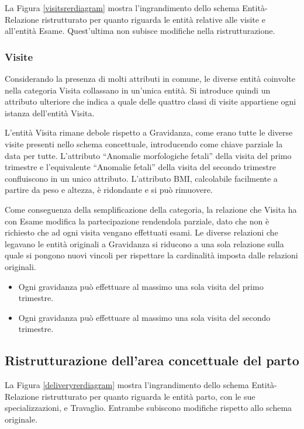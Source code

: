 La Figura \ref{visitsrerdiagram} mostra l'ingrandimento dello schema Entità-Relazione ristrutturato per quanto riguarda le entità relative alle visite e all'entità Esame.
Quest'ultima non subisce modifiche nella ristrutturazione.

\subsubsection{Visite}

Considerando la presenza di molti attributi in comune, le diverse entità coinvolte nella categoria Visita collassano in un'unica entità.
Si introduce quindi un attributo ulteriore che indica a quale delle quattro classi di visite appartiene ogni istanza dell'entità Visita.

L'entità Visita rimane debole rispetto a Gravidanza, come erano tutte le diverse visite presenti nello schema concettuale, introducendo come chiave parziale la data per tutte.
L'attributo \enquote{Anomalie morfologiche fetali} della visita del primo trimestre e l'equivalente \enquote{Anomalie fetali} della visita del secondo trimestre confluiscono in un unico attributo.
L'attributo BMI, calcolabile facilmente a partire da peso e altezza, è ridondante e si può rimuovere.

Come conseguenza della semplificazione della categoria, la relazione che Visita ha con Esame modifica la partecipazione rendendola parziale, dato che non è richiesto che ad ogni visita vengano effettuati esami.
Le diverse relazioni che legavano le entità originali a Gravidanza si riducono a una sola relazione sulla quale si pongono nuovi vincoli per rispettare la cardinalità imposta dalle relazioni originali.
\begin{itemize}
\item[\Con{}] Ogni gravidanza può effettuare al massimo una sola visita del primo trimestre.
\item[\Con{}] Ogni gravidanza può effettuare al massimo una sola visita del secondo trimestre.
\end{itemize}

\subsection{Ristrutturazione dell'area concettuale del parto}

La Figura \ref{deliveryrerdiagram} mostra l'ingrandimento dello schema Entità-Relazione ristrutturato per quanto riguarda le entità parto, con le sue specializzazioni, e Travaglio.
Entrambe subiscono modifiche rispetto allo schema originale.

